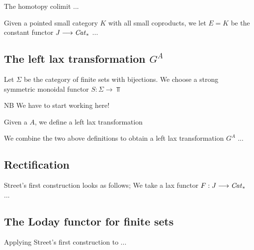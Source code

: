     \begin{defn}\label{def_hocolim}
      The homotopy colimit ...
    \end{defn}

    \begin{rem}\label{rem_bimod_for_constant_functor_and_hocolim}
      Given a pointed small category $K$ with all small coproducts, we let $E = K$ be the constant functor $J \longrightarrow \mathit{Cat}_*$ ...
    \end{rem}

  \subsection{The left lax transformation $G^A$}

    \begin{defn}\label{def_left_lax_transformation_S}
      Let $\Sigma$ be the category of finite sets with bijections. We choose a strong symmetric monoidal functor $S: \Sigma \to \Top$
    \end{defn}

    NB We have to start working here!

    \begin{defn}\label{def_left_lax_transformation_A}
      Given a \hring $A$, we define a left lax transformation
    \end{defn}

    \begin{defn}\label{def_left_lax_transform_G^A}
      We combine the two above definitions to obtain a left lax transformation $G^A$ ...
    \end{defn}

  \subsection{Rectification}

    \begin{defn}\label{def_streets_first_construction}
      Street's first construction looks as follows; We take a lax functor $F: J \longrightarrow \mathit{Cat}_*$ ...
    \end{defn}

  \subsection{The Loday functor for finite sets}
    \begin{defn}\label{def_rectification_of_G^A}
      Applying Street's first construction to ...
    \end{defn}

